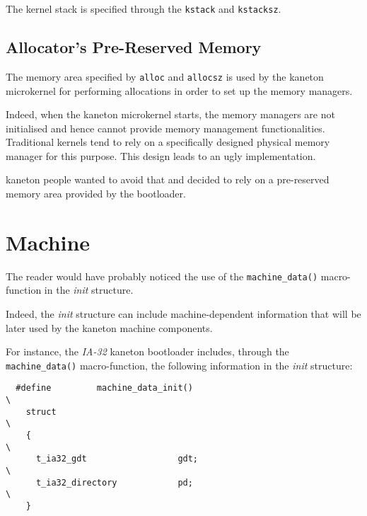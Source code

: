 The kernel stack is specified through the \texttt{kstack} and
\texttt{kstacksz}.


\subsection*{Allocator's Pre-Reserved Memory}

The memory area specified by \texttt{alloc} and \texttt{allocsz} is used
by the kaneton microkernel for performing allocations in order to set up
the memory managers.

Indeed, when the kaneton microkernel starts, the memory managers are
not initialised and hence cannot provide memory management functionalities.
Traditional kernels tend to rely on a specifically designed physical memory
manager for this purpose. This design leads to an ugly implementation.

kaneton people wanted to avoid that and decided to rely on a pre-reserved
memory area provided by the bootloader.

%
%

\section{Machine}

The reader would have probably noticed the use of the \texttt{machine\_data()}
macro-function in the \textit{init} structure.

Indeed, the \textit{init} structure can include machine-dependent information
that will be later used by the kaneton machine components.

For instance, the \textit{IA-32} kaneton bootloader includes, through
the \texttt{machine\_data()} macro-function, the following information in
the \textit{init} structure:

\begin{verbatim}
  #define         machine_data_init()                                     \
    struct                                                                \
    {                                                                     \
      t_ia32_gdt                  gdt;                                    \
      t_ia32_directory            pd;                                     \
    }
\end{verbatim}
